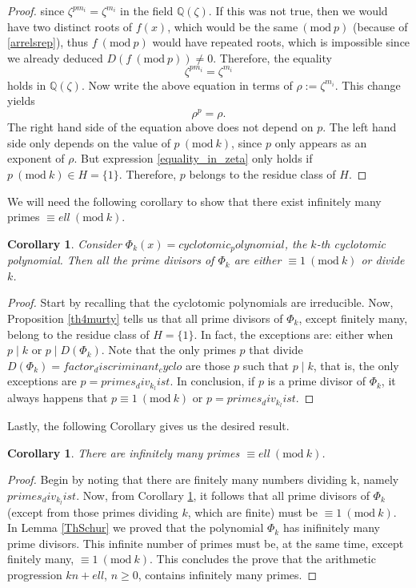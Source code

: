 \documentclass[a4paper, 12pt]{article}
\newtheorem{corollary}[theorem]{Corollary}
\theoremstyle{definition}
\theoremstyle{remark}
\newcommand{\Q}{\ensuremath{\mathbb{Q}}}
\newcommand{\Mod}[1]{\ (\mathrm{mod}\ #1)} %
\begin{document}
\begin{proof}
since $\zeta^{pm_i}=\zeta^{m_i}$ in the field $\Q(\zeta)$. If this was not true, then we would have two distinct roots of $f(x)$, which would be the same$\Mod{p}$ (because of \eqref{arrelsrep}), thus $f \Mod{p}$ would have repeated roots, which is impossible since we already deduced $D(f \Mod{p})\neq 0$. Therefore, the equality
\begin{equation*}
\zeta^{pm_i}=\zeta^{m_i}
\end{equation*}
holds in $\Q(\zeta)$. Now write the above equation in terms of $\rho:=\zeta^{m_i}$. This change yields
\begin{equation}
\rho^{p}=\rho \label{equality_in_zeta}.
\end{equation}
The right hand side of the equation above does not depend on $p$. The left hand side only depends on the value of $p\Mod{{k}}$, since $p$ only appears as an exponent of $\rho$. But expression \eqref{equality_in_zeta} only holds if $p \Mod{{k}}\in H=\{1\}$. Therefore, $p$ belongs to the residue class of $H$.
\end{proof}

We will need the following corollary to show that there exist infinitely many primes $\equiv {ell}\Mod{{k}}$.

\begin{corollary}\label{CyclotomicCorollary}
Consider $\Phi_{{k}}(x)={cyclotomic_polynomial}$, the ${k}$-th cyclotomic polynomial. Then all the prime divisors of $\Phi_{{k}}$ are either $\equiv 1\Mod{{k}}$ or divide ${k}$.
\end{corollary}
\begin{proof}
Start by recalling that the cyclotomic polynomials are irreducible. Now, Proposition \ref{th4murty} tells us that all prime divisors of $\Phi_{{k}}$, except finitely many, belong to the residue class of $H=\{1\}$. In fact, the exceptions are: either when $p\mid {k}$ or $p\mid D(\Phi_{{k}})$. Note that the only primes $p$ that divide $D(\Phi_{{k}})={factor_discriminant_cyclo}$ are those $p$ such that $p\mid {k}$, that is, the only exceptions are $p={primes_div_k_list}$. In conclusion, if $p$ is a prime divisor of $\Phi_{{k}}$, it always happens that $p\equiv 1\Mod{{k}}$ or $p={primes_div_k_list}$.
\end{proof}

Lastly, the following Corollary gives us the desired result.
\begin{corollary}
	There are infinitely many primes $\equiv {ell} \Mod{{k}}$.
\end{corollary}
\begin{proof}
Begin by noting that there are finitely many numbers dividing {k}, namely ${primes_div_k_list}$. Now, from Corollary \ref{CyclotomicCorollary}, it follows that all prime divisors of $\Phi_{{k}}$ (except from those primes dividing ${k}$, which are finite) must be $\equiv 1\Mod{{k}}$. In Lemma \ref{ThSchur} we proved that the polynomial $\Phi_{{k}}$ has inifinitely many prime divisors. This infinite number of primes must be, at the same time, except finitely many, $\equiv 1\Mod{{k}}$. This concludes the prove that the arithmetic progression ${k}n+{ell}$, $n\geqslant 0$, contains infinitely many primes.
\end{proof}

\newpage
	


\end{document}
